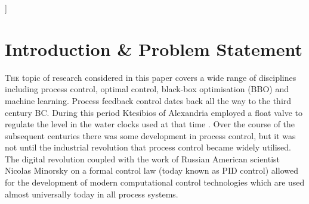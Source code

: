 \documentclass[conference]{IEEEtran}
\theoremstyle{definition}
\begin{document}
\bigskip]
\thispagestyle{plain}


\IEEEpeerreviewmaketitle

\section{Introduction \& Problem Statement}
\lettrine{T}{he} topic of research considered in this paper covers a wide range of disciplines including process control, optimal control, black-box optimisation (BBO) and machine learning. Process feedback control dates back all the way to the third century BC. During this period Ktesibios of Alexandria employed a float valve to regulate the level in the water clocks used at that time \cite{BriefHist}. Over the course of the subsequent centuries there was some development in process control, but it was not until the industrial revolution that process control became widely utilised. The digital revolution coupled with the work of Russian American scientist Nicolas Minorsky on a formal control law (today known as PID control) \cite{PIDguy} allowed for the development of modern computational control technologies which are used almost universally today in all process systems.
\end{document}
